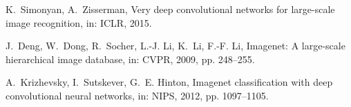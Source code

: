 \documentclass[preprint,5p,times,twocolumn]{elsarticle}
\begin{document}
\begin{thebibliography}{}
K.~Simonyan, A.~Zisserman, Very deep convolutional networks for large-scale
  image recognition, in: ICLR, 2015.

J.~Deng, W.~Dong, R.~Socher, L.-J. Li, K.~Li, F.-F. Li, Imagenet: A large-scale
  hierarchical image database, in: CVPR, 2009, pp. 248--255.

A.~Krizhevsky, I.~Sutskever, G.~E. Hinton, Imagenet classification with deep
  convolutional neural networks, in: NIPS, 2012, pp. 1097--1105.

\end{thebibliography}
\end{document}
